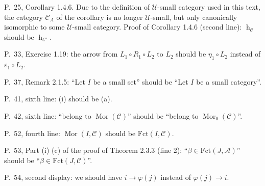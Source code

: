 \documentclass[12pt]{article}
\theoremstyle{remark}
\theoremstyle{definition}
\newcommand{\A}{\mathcal A}
\newcommand{\C}{\mathcal C}
\newcommand{\U}{\mathcal U}
\DeclareMathOperator*{\coli}{colim}
\DeclareMathOperator{\hy}{h}
\DeclareMathOperator{\Hom}{Hom}%
\DeclareMathOperator{\Mor}{Mor}
\DeclareMathOperator{\op}{op}
\begin{document}



\noindent P.~25, Corollary 1.4.6. Due to the definition of $\U$-small category used in this text, the category $\C_A$ of the corollary is no longer $\U$-small, but only canonically isomorphic to some $\U$-small category. Proof of Corollary 1.4.6 (second line): $\hy_{\C}$ should be $\hy_{\C'}$. 

\noindent P.~33, Exercise 1.19: the arrow from $L_1\circ R_1\circ L_2$ to $L_2$ should be $\eta_1\circ L_2$ instead of $\varepsilon_1\circ L_2$. 


\noindent P.~37, Remark 2.1.5: ``Let $I$ be a small set'' should be ``Let $I$ be a small category''.

\noindent P.~41, sixth line: (i) should be (a). 

\noindent P.~42, sixth line: ``belong to $\Mor(\C)$'' should be ``belong to $\Mor_0(\C)$''.

\noindent P.~52, fourth line: $\Mor(I,\C)$ should be $\text{Fct}(I,\C)$. 

\noindent P.~53, Part (i) (c) of the proof of Theorem 2.3.3 (line 2): ``$\beta\in\text{Fct}(J,\A)$'' should be ``$\beta\in\text{Fct}(J,\C)$''.

\noindent P.~54, second display: we should have $i\to\varphi(j)$ instead of $\varphi(j)\to i$. 

\end{document}
